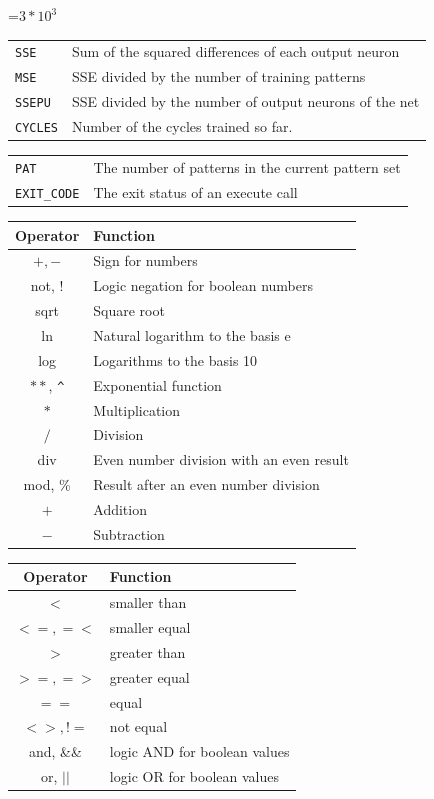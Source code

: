 {\newpage
\clearpage
\samepage \setbox\sizebox=\hbox{$3*10^{3}$}\box\sizebox
}

{\newpage
\clearpage
\samepage \begin{tabular}{|l|l|} \hline
{\tt SSE} & Sum of the squared differences of each output neuron\\ 
{\tt MSE} & SSE divided by the number of training patterns\\ 
{\tt SSEPU} & SSE divided by the number of output neurons of the net\\ 
{\tt CYCLES} &  Number of the cycles trained so far.\\  \hline
\end{tabular}
}

{\newpage
\clearpage
\samepage \begin{tabular}{|l|l|} \hline
{\tt PAT} & The number of patterns in the current pattern set\\ 
{\tt EXIT\_CODE} & The exit status of an execute call\\  \hline
\end{tabular}
}

{\newpage
\clearpage
\samepage \begin{tabular}{|c|l|}\hline
Operator & Function \rule[-3mm]{0mm}{8mm} \\  \hline
$+,-$ & Sign for numbers\\ 
not, ! & Logic negation for boolean numbers\\ 
sqrt & Square root \\ 
ln & Natural logarithm to the basis e\\ 
log & Logarithms to the basis 10 \\ 
$**$, \verb+^+ & Exponential function\\ 
$*$ & Multiplication\\ 
$/$ & Division \\ 
div & Even number division with an even result\\ 
mod, \% & Result after an even number division\\ 
$+$ & Addition \\ 
$-$ & Subtraction \\ 
\hline
\end{tabular}
}

{\newpage
\clearpage
\samepage \begin{tabular}{|c|l|}\hline
Operator & Function \rule[-3mm]{0mm}{8mm} \\  \hline
$<$ & smaller than \\ 
$<=,=<$ & smaller equal \\ 
$>$ & greater than \\ 
$>=,=>$ & greater equal \\ 
$==$ & equal \\ 
$<>,!=$ & not equal \\ 
and, \&\& & logic AND for boolean values\\ 
or, $||$ & logic OR for boolean values\\ \hline
\end{tabular}
}

